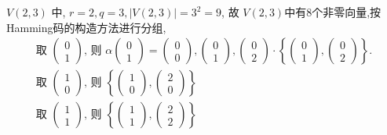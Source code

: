 \begin{example}
  $ V(2,3) $ 中, $ r=2, q=3,|V(2,3)|=3^{2}=9 $, 故 $ V(2,3) $中有8个非零向量,按Hamming码的构造方法进行分组, 
$$
\begin{array}{l}
\text {  取 }\left(\begin{array}{l}
0 \\
1
\end{array}\right) \text {, 则 } \alpha\left(\begin{array}{l}
0 \\
1
\end{array}\right)=\left(\begin{array}{l}
0 \\
0
\end{array}\right),\left(\begin{array}{l}
0 \\
1
\end{array}\right),\left(\begin{array}{l}
0 \\
2
\end{array}\right) \cdot\left\{\left(\begin{array}{l}
0 \\
1
\end{array}\right),\left(\begin{array}{l}
0 \\
2
\end{array}\right)\right\} \text {. } \\
\text { 取 }\left(\begin{array}{l}
1 \\
0
\end{array}\right) \text {, 则 }\left\{\left(\begin{array}{l}
1 \\
0
\end{array}\right),\left(\begin{array}{l}
2 \\
0
\end{array}\right)\right\} \\
\text { 取 }\left(\begin{array}{l}
1 \\
1
\end{array}\right) \text {, 则 }\left\{\left(\begin{array}{l}
1 \\
1
\end{array}\right),\left(\begin{array}{l}
2 \\
2
\end{array}\right)\right\} \\

\end{array}$$
\end{example}

